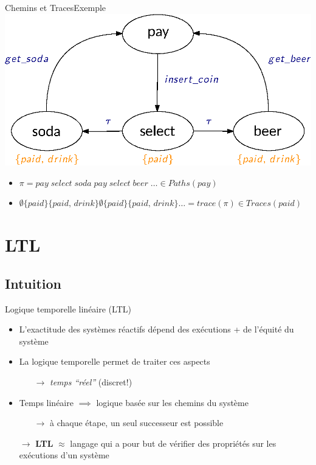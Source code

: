 \documentclass[compress]{beamer}
\begin{document}
\begin{frame}{Chemins et Traces}{Exemple}
    \centering
    \includegraphics[width=0.7\linewidth]{resources/TS.eps}
    \scriptsize
    \begin{itemize}
      \item $\pi = pay\; select \; soda \; pay \; select \; beer \; \dots \in Paths(pay)$
      \item $\emptyset\{paid\}\{paid, \, drink\}\emptyset\{paid\}\{paid, \, drink\} \dots = trace(\pi) \in Traces(paid)$
    \end{itemize}
\end{frame}

\section{LTL}
\subsection{Intuition}
\begin{frame}{Logique temporelle linéaire (LTL)}
\begin{itemize}
  \item L'exactitude des systèmes réactifs dépend des exécutions + de l'équité du système
  \item La logique {\color{fibeamer@orange}temporelle} permet de traiter ces aspects
  \begin{itemize}
    \item[$\rightarrow$] \textit{temps ``réel''} (discret!)
  \end{itemize}
  \item Temps linéaire $\implies$ logique basée sur les {\color{fibeamer@orange}chemins du système}
    \begin{itemize}
      \item[$\rightarrow$] \`a chaque étape, un seul successeur est possible
    \end{itemize}
    \item[$\rightarrow$] \textbf{\color{fibeamer@orange}LTL} $\approx$ langage qui a pour but de vérifier des propriétés sur les exécutions d'un système%
\end{itemize}
\end{frame}
\end{document}
